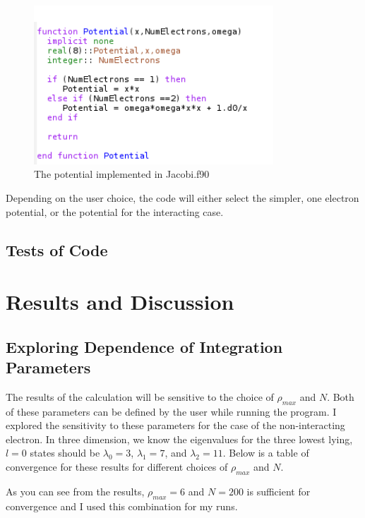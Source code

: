 \documentclass[%
oneside,                 %
final,                   %
10pt]{article}
\begin{document}
\begin{figure}[H]\label{fig:Potential}
  \centering
    \includegraphics[width=0.8\textwidth]{Potential.PNG}
    \caption{The potential implemented in Jacobi.f90}
\end{figure}

Depending on the user choice, the code will either select the simpler, one electron potential, or the potential for the interacting case.

\subsection{Tests of Code}


\section{Results and Discussion}


\subsection{Exploring Dependence of Integration Parameters}

The results of the calculation will be sensitive to the choice of $\rho_{max}$ and $N$.  Both of these parameters can be defined by the user while running the program.  I explored the sensitivity to these parameters for the case of the non-interacting electron.  In three dimension, we know the eigenvalues for the three lowest lying, $l=0$ states should be $\lambda_0=3$, $\lambda_1=7$, and $\lambda_2=11$.  Below is a table of convergence for these results for different choices of  $\rho_{max}$ and $N$.

As you can see from the results, $\rho_{max}=6$ and $N=200$ is sufficient for convergence and I used this combination for my runs.
\end{document}
